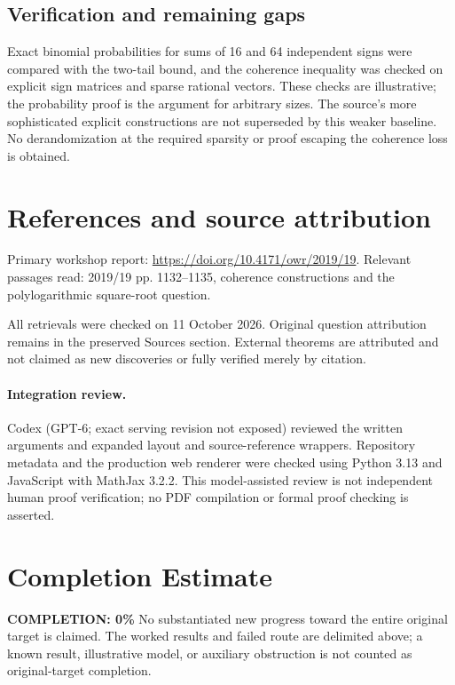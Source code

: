 \documentclass[11pt]{article}
\begin{document}
\subsection{Verification and remaining gaps}
Exact binomial probabilities for sums of 16 and 64 independent signs were compared with the two-tail bound, and the coherence inequality was checked on explicit sign matrices and sparse rational vectors. These checks are illustrative; the probability proof is the argument for arbitrary sizes. The source's more sophisticated explicit constructions are not superseded by this weaker baseline. No derandomization at the required sparsity or proof escaping the coherence loss is obtained.

\section{References and source attribution}
Primary workshop report: \url{https://doi.org/10.4171/owr/2019/19}. Relevant passages read: 2019/19 pp. 1132--1135, coherence constructions and the polylogarithmic square-root question.

All retrievals were checked on 11 October 2026. Original question attribution remains in the preserved Sources section. External theorems are attributed and not claimed as new discoveries or fully verified merely by citation.


\paragraph{Integration review.} Codex (GPT-6; exact serving revision not exposed) reviewed the written arguments and expanded layout and source-reference wrappers. Repository metadata and the production web renderer were checked using Python 3.13 and JavaScript with MathJax 3.2.2. This model-assisted review is not independent human proof verification; no PDF compilation or formal proof checking is asserted.

\section{Completion Estimate}
\noindent\textbf{COMPLETION: 0\%}
No substantiated new progress toward the entire original target is claimed. The worked results and failed route are delimited above; a known result, illustrative model, or auxiliary obstruction is not counted as original-target completion.
\end{document}
